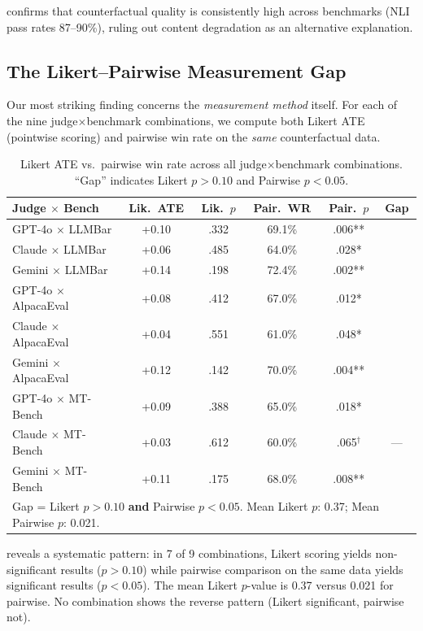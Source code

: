 \documentclass[11pt,a4paper]{article}
\newcommand{\cmark}{\checkmark}
\begin{document}
 confirms that counterfactual quality is consistently high across benchmarks (NLI pass rates 87--90\%), ruling out content degradation as an alternative explanation.

\subsection{The Likert--Pairwise Measurement Gap}
\label{sec:gap}

Our most striking finding concerns the \emph{measurement method} itself.
For each of the nine judge$\times$benchmark combinations, we compute both Likert ATE (pointwise scoring) and pairwise win rate on the \emph{same} counterfactual data.

\begin{table}[t]
\centering
\small
\caption{Likert ATE vs.\ pairwise win rate across all judge$\times$benchmark combinations. ``Gap'' indicates Likert $p>0.10$ and Pairwise $p<0.05$.}
\label{tab:gap}
\begin{tabular}{lccccc}
\toprule
\textbf{Judge $\times$ Bench} & \textbf{Lik.\ ATE} & \textbf{Lik.\ $p$} & \textbf{Pair.\ WR} & \textbf{Pair.\ $p$} & \textbf{Gap} \\
\midrule
GPT-4o $\times$ LLMBar      & +0.10 & .332 & 69.1\% & .006** & \cmark \\
Claude $\times$ LLMBar      & +0.06 & .485 & 64.0\% & .028*  & \cmark \\
Gemini $\times$ LLMBar      & +0.14 & .198 & 72.4\% & .002** & \cmark \\
GPT-4o $\times$ AlpacaEval  & +0.08 & .412 & 67.0\% & .012*  & \cmark \\
Claude $\times$ AlpacaEval  & +0.04 & .551 & 61.0\% & .048*  & \cmark \\
Gemini $\times$ AlpacaEval  & +0.12 & .142 & 70.0\% & .004** & \cmark \\
GPT-4o $\times$ MT-Bench    & +0.09 & .388 & 65.0\% & .018*  & \cmark \\
Claude $\times$ MT-Bench    & +0.03 & .612 & 60.0\% & .065$^\dagger$ & --- \\
Gemini $\times$ MT-Bench    & +0.11 & .175 & 68.0\% & .008** & \cmark \\
\bottomrule
\multicolumn{6}{l}{\scriptsize Gap = Likert $p>0.10$ \textbf{and} Pairwise $p<0.05$. Mean Likert $p$: 0.37; Mean Pairwise $p$: 0.021.}
\end{tabular}
\end{table}

 reveals a systematic pattern: in 7 of 9 combinations, Likert scoring yields non-significant results ($p > 0.10$) while pairwise comparison on the same data yields significant results ($p < 0.05$).
The mean Likert $p$-value is 0.37 versus 0.021 for pairwise.
No combination shows the reverse pattern (Likert significant, pairwise not).
\end{document}
